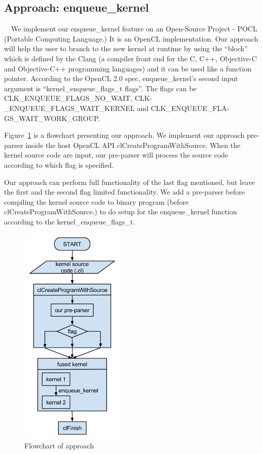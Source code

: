\documentclass{sigplanconf}
\begin{document}
\subsection{Approach: enqueue\_kernel}
\quad\ \ We implement our enqueue\_kernel feature on an Open-Source Project - POCL\cite{poclori} (Portable Computing Language.) It is an OpenCL implementation. Our approach will help the user to branch to the new kernel at runtime by using the “block” which is defined by the Clang\cite{clangori} (a compiler front end for the C, C++, Objective-C and Objective-C++ programming languages) and it can be used like a function pointer. According to the OpenCL 2.0 spec\cite{opencl2.0spec}, enqueue\_kernel’s second input argument is “kernel\_enqueue\_flags\_t flags”. The flags can be CLK\_ENQUEUE\_FLAGS\_NO\_WAIT, CLK-
\_ENQUEUE\_FLAGS\_WAIT\_KERNEL and CLK\_ENQUEUE\_FLA-
GS\_WAIT\_WORK\_GROUP.

    Figure~\ref{fig:my_label6} is a flowchart presenting our approach. We implement our approach pre-parser inside the host OpenCL API clCreateProgramWithSource. When the kernel source code are input, our pre-parser will process the source code according to which flag is specified.

	Our approach can perform full functionality of the last flag mentioned, but leave the first and the second flag limited functionality. We add a pre-parser before compiling the kernel source code to binary program (before clCreateProgramWithSource.) to do setup for the enqueue\_kernel function according to the kernel\_enqueue\_flags\_t. 
	
\begin{figure}[hbtp]
\centering
\includegraphics[width=5cm]{img/overview-approach.png}
\caption{Flowchart of approach}
\label{fig:my_label6}
\end{figure}
\end{document}

